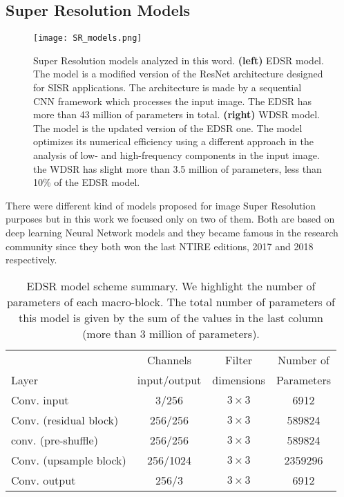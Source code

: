 \documentclass{standalone}
\begin{document}
\subsection[Super Resolution Models]{Super Resolution Models}\label{SR:wdsr}

\begin{center}
\begin{figure}[htbp]
\centering
\texttt{[image: SR\_models.png]}
\caption{Super Resolution models analyzed in this word.
\textbf{(left)} EDSR model.
The model is a modified version of the ResNet architecture designed for SISR applications.
The architecture is made by a sequential CNN framework which processes the input image.
The EDSR has more than 43 million of parameters in total.
\textbf{(right)} WDSR model.
The model is the updated version of the EDSR one.
The model optimizes its numerical efficiency using a different approach in the analysis of low- and high-frequency components in the input image.
the WDSR has slight more than 3.5 million of parameters, less than 10\% of the EDSR model.
}
\label{fig:sr_models}
\end{figure}
\end{center}

There were different kind of models proposed for image Super Resolution purposes but in this work we focused only on two of them.
Both are based on deep learning Neural Network models and they became famous in the research community since they both won the last NTIRE editions, 2017 and 2018 respectively.

\begin{table}[htbp]
\centering
\begin{tabular}{lccc}
\hline \rowcolor{darkgrayrow}
                         &  Channels     & Filter     & Number of    \\
\rowcolor{darkgrayrow}
Layer                    & input/output  & dimensions & Parameters   \\
\hline
Conv. input              & 3/256      & $3\times3$   & 6912    \\
Conv. (residual block)   & 256/256    & $3\times3$   & 589824  \\
conv. (pre-shuffle)      & 256/256    & $3\times3$   & 589824  \\
Conv. (upsample block)   & 256/1024   & $3\times3$   & 2359296 \\
Conv. output             & 256/3      & $3\times3$   & 6912    \\
\hline
\end{tabular}
\caption{EDSR model scheme summary.
We highlight the number of parameters of each macro-block.
The total number of parameters of this model is given by the sum of the values in the last column (more than 3 million of parameters).
}
\label{tab:edsr}
\end{table}
\end{document}

